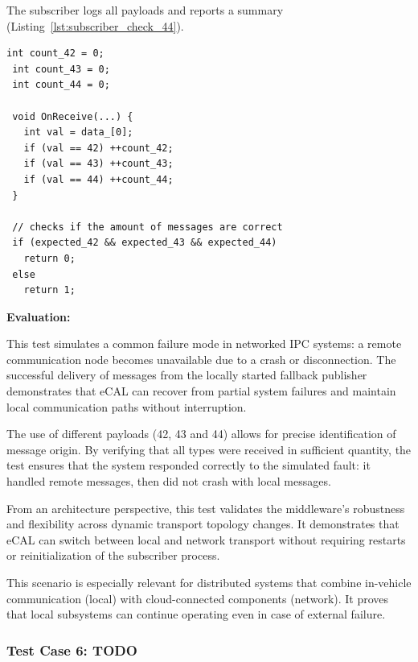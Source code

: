 \vspace{0.4em}
The subscriber logs all payloads and reports a summary (Listing~\ref{lst:subscriber_check_44}).

\begin{lstlisting}[style=cppstyle, caption={Subscriber validation logic for all payloads}, label={lst:subscriber_check_44}, captionpos=b]
 int count_42 = 0;
 int count_43 = 0;
 int count_44 = 0;
	
 void OnReceive(...) {
   int val = data_[0];
   if (val == 42) ++count_42;
   if (val == 43) ++count_43;
   if (val == 44) ++count_44;
 }
 
 // checks if the amount of messages are correct
 if (expected_42 && expected_43 && expected_44)
   return 0;
 else
   return 1;
\end{lstlisting}

\vspace{1em}
\textbf{Evaluation:}

\vspace{0.4em}
This test simulates a common failure mode in networked IPC systems: a remote communication node becomes unavailable due to a crash or disconnection. The successful delivery of messages from the locally started fallback publisher demonstrates that eCAL can recover from partial system failures and maintain local communication paths without interruption.

\vspace{1em}
The use of different payloads (42, 43 and 44) allows for precise identification of message origin. By verifying that all types were received in sufficient quantity, the test ensures that the system responded correctly to the simulated fault: it handled remote messages, then did not crash with local messages.

\vspace{1em}
From an architecture perspective, this test validates the middleware's robustness and flexibility across dynamic transport topology changes. It demonstrates that eCAL can switch between local and network transport without requiring restarts or reinitialization of the subscriber process.

\vspace{1em}
This scenario is especially relevant for distributed systems that combine in-vehicle communication (local) with cloud-connected components (network). It proves that local subsystems can continue operating even in case of external failure.

\subsubsection{Test Case 6: TODO}

